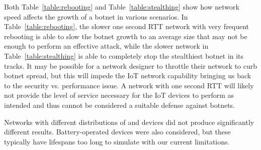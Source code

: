 Both Table~\ref{table:rebooting} and Table~\ref{table:stealthing} show how network speed affects the growth of a botnet in various scenarios. In Table~\ref{table:rebooting}, the slower one second RTT network with very frequent rebooting is able to slow the botnet growth to an average size that may not be enough to perform an effective attack, while the slower network in Table~\ref{table:stealthing} is able to completely stop the stealthiest botnet in its tracks. It may be possible for a network designer to throttle their network to curb botnet spread, but this will impede the IoT network capability bringing us back to the security vs. performance issue. A network with one second RTT will likely not provide the level of service necessary for the IoT devices to perform as intended and thus cannot be considered a suitable defense against botnets.

\par


Networks with different distributions of \AC and \RC devices did not produce significantly different results. Battery-operated devices were also considered, but these typically have lifespans too long to simulate with our current limitations.